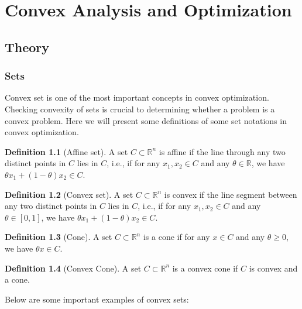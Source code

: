 \documentclass[
]{book}
\theoremstyle{definition}
\newtheorem{definition}{Definition}[chapter]
\theoremstyle{definition}
\theoremstyle{definition}
\theoremstyle{definition}
\theoremstyle{remark}
\begin{document}
\chapter{Convex Analysis and Optimization}\label{appconvex}

\section{Theory}\label{appconvex-theory}

\subsection{Sets}\label{sets}

Convex set is one of the most important concepts in convex optimization. Checking convexity of sets is crucial to determining whether a problem is a convex problem. Here we will present some definitions of some set notations in convex optimization.

\begin{definition}[Affine set]
\protect\hypertarget{def:affineset}{}\label{def:affineset}A set \(C\subset \mathbb{R}^n\) is affine if the line through any two distinct points in \(C\) lies in \(C\), i.e., if for any \(x_1,x_2 \in C\) and any \(\theta \in \mathbb{R}\), we have \(\theta x_1 + (1-\theta)x_2 \in C\).
\end{definition}

\begin{definition}[Convex set]
\protect\hypertarget{def:convexset}{}\label{def:convexset}A set \(C\subset \mathbb{R}^n\) is convex if the line segment between any two distinct points in \(C\) lies in \(C\), i.e., if for any \(x_1,x_2 \in C\) and any \(\theta \in [0,1]\), we have \(\theta x_1 + (1-\theta)x_2 \in C\).
\end{definition}

\begin{definition}[Cone]
\protect\hypertarget{def:cone}{}\label{def:cone}A set \(C\subset \mathbb{R}^n\) is a cone if for any \(x\in C\) and any \(\theta\geq 0\), we have \(\theta x \in C\).
\end{definition}

\begin{definition}[Convex Cone]
\protect\hypertarget{def:convexcone}{}\label{def:convexcone}A set \(C\subset \mathbb{R}^n\) is a convex cone if \(C\) is convex and a cone.
\end{definition}

Below are some important examples of convex sets:
\end{document}
